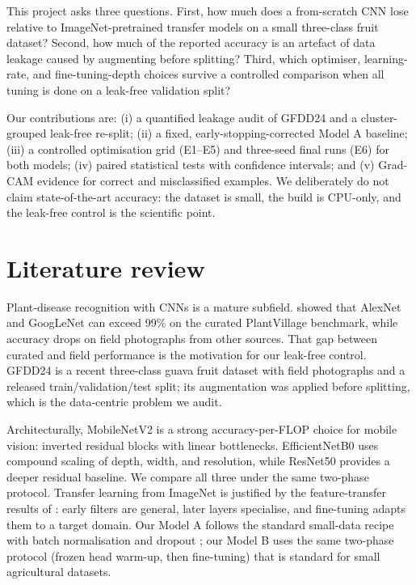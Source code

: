 \documentclass[11pt,a4paper]{article}
\begin{document}
This project asks three questions. First, how much does a from-scratch CNN
lose relative to ImageNet-pretrained transfer models on a small three-class
fruit dataset? Second, how much of the reported accuracy is an artefact of
data leakage caused by augmenting before splitting? Third, which optimiser,
learning-rate, and fine-tuning-depth choices survive a controlled comparison
when all tuning is done on a leak-free validation split?

Our contributions are: (i) a quantified leakage audit of GFDD24 and a
cluster-grouped leak-free re-split; (ii) a fixed, early-stopping-corrected
Model A baseline; (iii) a controlled optimisation grid (E1--E5) and three-seed
final runs (E6) for both models; (iv) paired statistical tests with confidence
intervals; and (v) Grad-CAM evidence for correct and misclassified examples.
We deliberately do not claim state-of-the-art accuracy: the dataset is small,
the build is CPU-only, and the leak-free control is the scientific point.

\section{Literature review}
Plant-disease recognition with CNNs is a mature subfield. \citet{mohanty2016plant}
showed that AlexNet and GoogLeNet can exceed 99\% on the curated PlantVillage
benchmark, while accuracy drops on field photographs from other sources. That
gap between curated and field performance is the motivation for our leak-free
control. GFDD24 \citep{gfdd24} is a recent three-class guava fruit dataset with
field photographs and a released train/validation/test split; its augmentation
was applied before splitting, which is the data-centric problem we audit.

Architecturally, MobileNetV2 \citep{sandler2018mobilenetv2} is a strong
accuracy-per-FLOP choice for mobile vision: inverted residual blocks with
linear bottlenecks. EfficientNetB0 \citep{tan2019efficientnet} uses compound
scaling of depth, width, and resolution, while ResNet50
\citep{he2016resnet} provides a deeper residual baseline. We compare all three
under the same two-phase protocol. Transfer learning from ImageNet
\citep{russakovsky2015imagenet} is justified by the feature-transfer results of
\citet{yosinski2014transfer}: early filters are general, later layers
specialise, and fine-tuning adapts them to a target domain. Our Model A follows
the standard small-data recipe with batch normalisation
\citep{ioffe2015bn} and dropout \citep{srivastava2014dropout}; our Model B uses
the same two-phase protocol (frozen head warm-up, then fine-tuning) that is
standard for small agricultural datasets.
\end{document}
